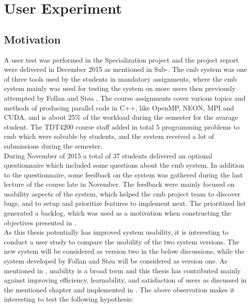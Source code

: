 \section{User Experiment}
\label{sec:user-testing}

\subsection{Motivation}
A user test was performed in the Specialization project and the project report were delivered in December 2015 as mentioned in Sub-. The \gls{cmb} system was one of three tools used by the students in mandatory assignments, where the \gls{cmb} system mainly was used for testing the system on more users then previously attempted by Follan and Støa \cite{mt:T&S}. The course assignments cover various topics and methods of producing parallel code in C++, like OpenMP, NEON, MPI and CUDA, and is about 25\% of the workload during the semester for the avarage student. The TDT4200 course staff added in total 5 programming problems to \gls{cmb} which were solvable by students, and the system received a lot of submissions during the semester. \\

During November of 2015 a total of 37 students delivered an optional questionnaire which included some questions about the \gls{cmb} system. In addition to the questionnaire, some feedback on the system was gathered during the last lecture of the course late in November. The feedback were mainly focused on usability aspects of the system, which helped the \gls{cmb} project team to discover bugs, and to setup and prioritize features to implement next. The prioritized list generated a backlog, which was used as a motivation when constructing the objectives presented in . \\

As this thesis potentially has improved system usability, it is interesting to conduct a user study to compare the usability of the two system versions. The new system will be considered as version two in the below discussions, while the system developed by Follan and Støa will be considered as version one. As mentioned in , usability is a broad term and this thesis has contributed mainly against improving efficiency, learnability, and satisfaction of users as discussed in the mentioned chapter and implemented in . The above observation makes it interesting to test the following hypothesis:

